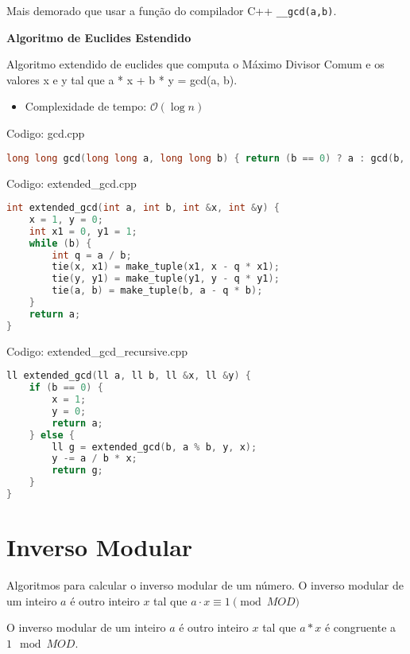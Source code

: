 \documentclass[10pt, a4paper, oneside]{book}
\begin{document}
Mais demorado que usar a função do compilador C++ \texttt{\_\_gcd(a,b)}.



\textbf{Algoritmo de Euclides Estendido} 



Algoritmo extendido de euclides que computa o Máximo Divisor Comum e os valores x e y tal que a * x + b * y = gcd(a, b).



\begin{itemize}
\item Complexidade de tempo: $\mathcal{O}(\log n)$
\end{itemize}

\hfill

Codigo: gcd.cpp

\begin{lstlisting}[language=C++]
long long gcd(long long a, long long b) { return (b == 0) ? a : gcd(b, a % b); }
\end{lstlisting}
\hfill

Codigo: extended\_gcd.cpp

\begin{lstlisting}[language=C++]
int extended_gcd(int a, int b, int &x, int &y) {
    x = 1, y = 0;
    int x1 = 0, y1 = 1;
    while (b) {
        int q = a / b;
        tie(x, x1) = make_tuple(x1, x - q * x1);
        tie(y, y1) = make_tuple(y1, y - q * y1);
        tie(a, b) = make_tuple(b, a - q * b);
    }
    return a;
}
\end{lstlisting}
\hfill

Codigo: extended\_gcd\_recursive.cpp

\begin{lstlisting}[language=C++]
ll extended_gcd(ll a, ll b, ll &x, ll &y) {
    if (b == 0) {
        x = 1;
        y = 0;
        return a;
    } else {
        ll g = extended_gcd(b, a % b, y, x);
        y -= a / b * x;
        return g;
    }
}
\end{lstlisting}
\hfill

\section{Inverso Modular}


Algoritmos para calcular o inverso modular de um número. O inverso modular de um inteiro $a$ é outro inteiro $x$ tal que $a \cdot x \equiv 1 \pmod{MOD}$



O inverso modular de um inteiro $a$ é outro inteiro $x$ tal que $a * x$ é congruente a $1 \mod MOD$.
\end{document}
